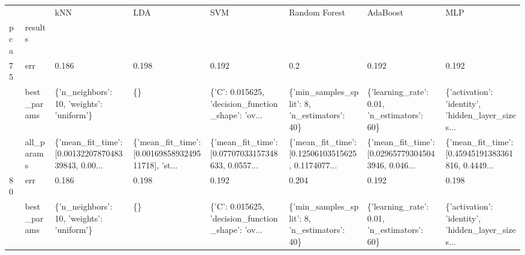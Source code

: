 \begin{tabular}{llllllll}
\toprule
    &            &                                                kNN &                                                LDA &                                                SVM &                                      Random Forest &                                           AdaBoost &                                                MLP \\
pca & results &                                                    &                                                    &                                                    &                                                    &                                                    &                                                    \\
\midrule
75  & err &                                              0.186 &                                              0.198 &                                              0.192 &                                                0.2 &                                              0.192 &                                              0.192 \\
    & best\_params &          \{'n\_neighbors': 10, 'weights': 'uniform'\} &                                                 \{\} &  \{'C': 0.015625, 'decision\_function\_shape': 'ov... &       \{'min\_samples\_split': 8, 'n\_estimators': 40\} &        \{'learning\_rate': 0.01, 'n\_estimators': 60\} &  \{'activation': 'identity', 'hidden\_layer\_sizes... \\
    & all\_params &  \{'mean\_fit\_time': [0.0013220787048339843, 0.00... &  \{'mean\_fit\_time': [0.0016985893249511718], 'st... &  \{'mean\_fit\_time': [0.07707033157348633, 0.0557... &  \{'mean\_fit\_time': [0.12506103515625, 0.1174077... &  \{'mean\_fit\_time': [0.029657793045043946, 0.046... &  \{'mean\_fit\_time': [0.45945191383361816, 0.4449... \\
80  & err &                                              0.186 &                                              0.198 &                                              0.192 &                                              0.204 &                                              0.192 &                                              0.198 \\
    & best\_params &          \{'n\_neighbors': 10, 'weights': 'uniform'\} &                                                 \{\} &  \{'C': 0.015625, 'decision\_function\_shape': 'ov... &       \{'min\_samples\_split': 8, 'n\_estimators': 40\} &        \{'learning\_rate': 0.01, 'n\_estimators': 60\} &  \{'activation': 'identity', 'hidden\_layer\_sizes... \\

\end{tabular}
